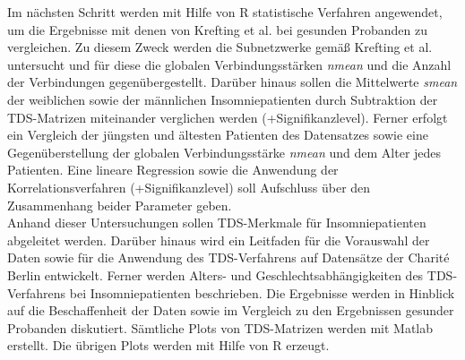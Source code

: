 Im nächsten Schritt werden mit Hilfe von R statistische Verfahren angewendet, um die Ergebnisse mit denen von Krefting et al. bei gesunden Probanden zu vergleichen. Zu diesem Zweck werden die Subnetzwerke gemäß Krefting et al. untersucht und für diese die globalen Verbindungsstärken \textit{nmean} und die Anzahl der Verbindungen gegenübergestellt. Darüber hinaus sollen die Mittelwerte \textit{smean} der weiblichen sowie der männlichen Insomniepatienten durch Subtraktion der \acs{TDS}-Matrizen miteinander verglichen werden (+Signifikanzlevel). Ferner erfolgt ein Vergleich der jüngsten und ältesten Patienten des Datensatzes sowie eine Gegenüberstellung der globalen Verbindungsstärke \textit{nmean} und dem Alter jedes Patienten. Eine lineare Regression sowie die Anwendung der Korrelationsverfahren (+Signifikanzlevel) soll Aufschluss über den Zusammenhang beider Parameter geben.\\

Anhand dieser Untersuchungen sollen \acs{TDS}-Merkmale für Insomniepatienten abgeleitet werden. Darüber hinaus wird ein Leitfaden für die Vorauswahl der Daten sowie für die Anwendung des \acs{TDS}-Verfahrens auf Datensätze der Charit\'{e} Berlin entwickelt. Ferner werden Alters- und Geschlechtsabhängigkeiten des \acs{TDS}-Verfahrens bei Insomniepatienten beschrieben. Die Ergebnisse werden in Hinblick auf die Beschaffenheit der Daten sowie im Vergleich zu den Ergebnissen gesunder Probanden diskutiert. Sämtliche Plots von \acs{TDS}-Matrizen werden mit Matlab erstellt. Die übrigen Plots werden mit Hilfe von R erzeugt.



